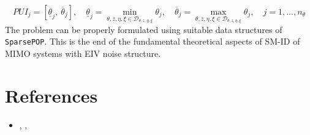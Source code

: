 {\normalsize{
    \begin{equation}
        PUI_j =[\underline{\theta}_j,\ \overline{\theta}_j], \quad \underline{\theta}_j = \min_{{\theta, z, \eta, \xi} \in\mathcal{D}_{\theta, z, \eta, \xi}} \theta_j, \quad
        \overline{\theta}_j = \max_{{\theta, z, \eta, \xi} \in\mathcal{D}_{\theta, z, \eta, \xi}} \theta_j, \quad 
        j=1,...,n_\theta
    \end{equation}
}}
\noindent
The problem can be properly formulated using suitable data structures of \texttt{SparsePOP}. This is the end of the fundamental theoretical aspects of SM-ID of MIMO systems with EIV noise structure.

\section*{References}
\begin{itemize}
    \item[\Large{\ding{45}}]  , \textit{}, 
\end{itemize}

